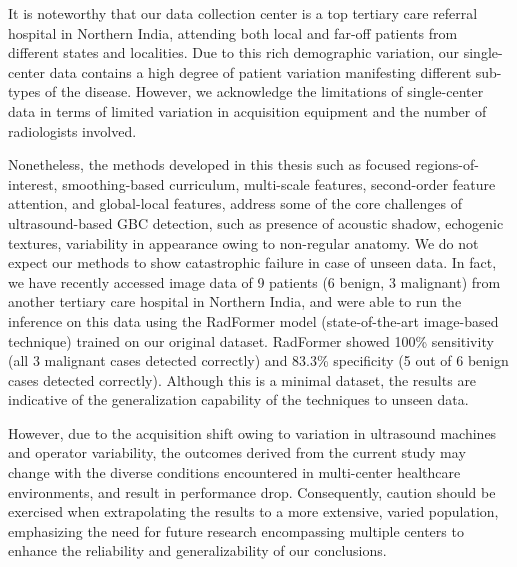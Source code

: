 \documentclass[11pt,times]{article}
\begin{document}
{%

It is noteworthy that our data collection center is a top tertiary care referral hospital in Northern India, attending both local and far-off patients from different states and localities. Due to this rich demographic variation, our single-center data contains a high degree of patient variation manifesting different sub-types of the disease. However, we acknowledge the limitations of single-center data in terms of limited variation in acquisition equipment and the number of radiologists involved. 

Nonetheless, the methods developed in this thesis such as focused regions-of-interest, smoothing-based curriculum, multi-scale features, second-order feature attention, and global-local features, address some of the core challenges of ultrasound-based GBC detection, such as presence of acoustic shadow, echogenic textures, variability in appearance owing to non-regular anatomy. We do not expect our methods to show catastrophic failure in case of unseen data. In fact, we have recently accessed image data of 9 patients (6 benign, 3 malignant) from another tertiary care hospital in Northern India, and were able to run the inference on this data using the RadFormer model (state-of-the-art image-based technique) trained on our original dataset. RadFormer showed 100\% sensitivity (all 3 malignant cases detected correctly) and 83.3\% specificity (5 out of 6 benign cases detected correctly). Although this is a minimal dataset, the results are indicative of the generalization capability of the techniques to unseen data. 

However, due to the acquisition shift owing to variation in ultrasound machines and operator variability, the outcomes derived from the current study may change with the diverse conditions encountered in multi-center healthcare environments, and result in performance drop. Consequently, caution should be exercised when extrapolating the results to a more extensive, varied population, emphasizing the need for future research encompassing multiple centers to enhance the reliability and generalizability of our conclusions.

}
\end{document}
